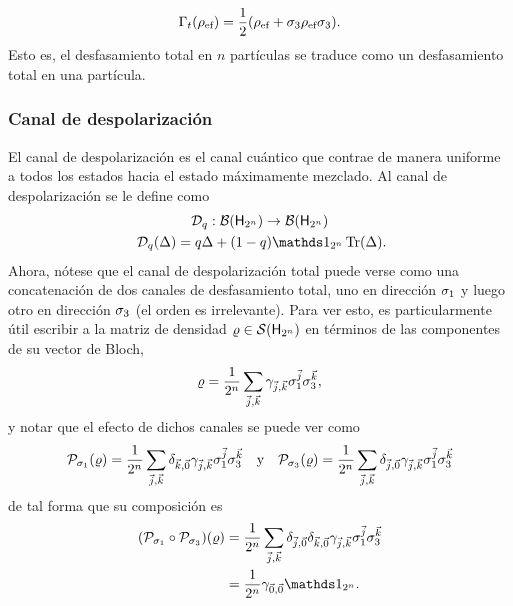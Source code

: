 \begin{equation}\label{eq:EffectiveDephasing}
    \Gamma_{t}(\rho_{\text{ef}})=\frac{1}{2}(\rho_{\text{ef}}+\sigma_{3}\rho_{\text{ef}}\sigma_{3}).
\end{equation}
Esto es, el desfasamiento total en $n$ partículas se traduce como un desfasamiento total en una partícula.


\subsubsection{Canal de despolarización}

El canal de despolarización es el canal cuántico que contrae de manera uniforme a todos los estados hacia el estado máximamente mezclado. Al canal de despolarización se le define como
\begin{gather}\label{eq:DepolarizingChannelN}
    \mcD_{q}:\mcB(\hilbert_{2^{n}}) \rightarrow \mcB(\hilbert_{2^{n}})\nonumber\\
    \mcD_{q}(\Delta)=q\Delta+(1-q)\Id_{2^{n}}\Tr(\Delta)\rlap{.}
\end{gather}
Ahora, nótese que el canal de despolarización total puede verse como una concatenación de dos canales de desfasamiento total, uno en dirección $\sigma_{1}$ y luego otro en dirección $\sigma_{3}$ (el orden es irrelevante). Para ver esto, es particularmente útil escribir a la matriz de densidad $\varrho\in\mathcal{S}({\sf H}_{2^{n}})$ en términos de las componentes de su vector de Bloch,
\begin{equation}
    \varrho=\frac{1}{2^{n}}\sum_{\vec{j},\vec{k}}\gamma_{\vec{j},\vec{k}}\sigma_{1}^{\vec{j}}\sigma_{3}^{\vec{k}},\nonumber
\end{equation}
y notar que el efecto de dichos canales se puede ver como
\begin{align}
    \mathcal{P}_{\sigma_{1}}(\varrho)=\frac{1}{2^{n}}\sum_{\vec{j},\vec{k}}\delta_{\vec{k},\vec{0}}\gamma_{\vec{j},\vec{k}}\sigma_{1}^{\vec{j}}\sigma_{3}^{\vec{k}}  & & \text{y} & & \mathcal{P}_{\sigma_{3}}(\varrho)=\frac{1}{2^{n}}\sum_{\vec{j},\vec{k}}\delta_{\vec{j},\vec{0}}\gamma_{\vec{j},\vec{k}}\sigma_{1}^{\vec{j}}\sigma_{3}^{\vec{k}} \nonumber
\end{align}
de tal forma que su composición es
\begin{align}
    \qty(\mcP_{\pauli{1}}\circ \mcP_{\pauli{3}})(\varrho)&=\frac{1}{2^{n}}\sum_{\vec{j},\vec{k}}\delta_{\vec{j},\vec{0}}\delta_{\vec{k},\vec{0}}\gamma_{\vec{j},\vec{k}}\pauli{1}^{\vec{j}}\pauli{3}^{\vec{k}}\nonumber\\
    &=\frac{1}{2^{n}}\gamma_{\vec{0},\vec{0}}\Id_{2^{n}}.\nonumber
\end{align}
